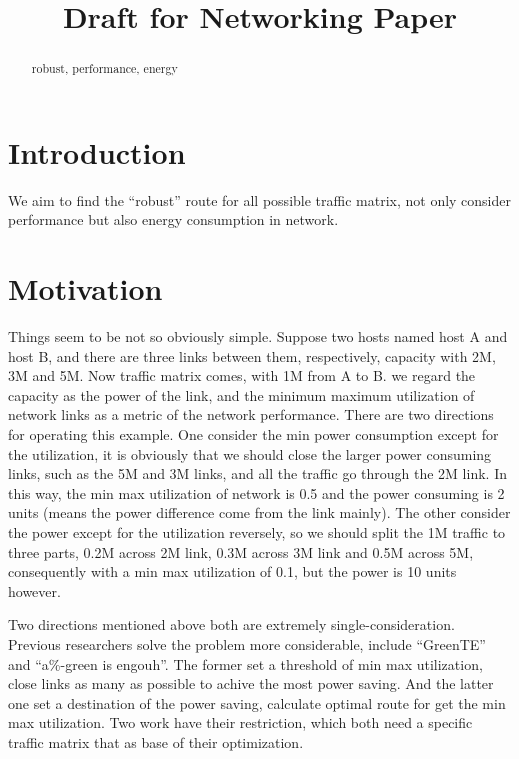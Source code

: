 \documentclass[conference]{IEEEtran}
\begin{document}
\title{Draft for Networking Paper}


\author{
\and
{}
\and
{}
}


\maketitle

\begin{abstract}
robust, performance, energy
\end{abstract}

\IEEEpeerreviewmaketitle

\section{Introduction}
We aim to find the ``robust'' route for all possible traffic matrix, not only consider performance but also energy 
consumption in network.

\section{Motivation}
Things seem to be not so obviously simple. Suppose two hosts named host A and host B, and there are three links between 
them, respectively, capacity with 2M, 3M and 5M. Now traffic matrix comes, with 1M from A to B. we regard the capacity 
as the power of the link, and the minimum maximum utilization of network links as a metric of the network performance. 
There are two directions for operating this example. One consider the min power consumption except for the 
utilization, it is obviously that we should close the larger power consuming links, such as the 5M and 3M links, and 
all the traffic go through the 2M link. In this way, the min max utilization of network is 0.5 and the power consuming 
is 2 units (means the power difference come from the link mainly). The other consider the power except for the 
utilization reversely, so we should split the 1M traffic to three parts, 0.2M across 2M link, 0.3M across 3M link and 
0.5M across 5M, consequently with a min max utilization of 0.1, but the power is 10 units however.

Two directions mentioned above both are extremely single-consideration. Previous researchers solve the problem more 
considerable, include ``GreenTE'' and ``a\%-green is engouh''. The former set a threshold of min max utilization, 
close links as many as possible to achive the most power saving. And the latter one set a destination of the power 
saving, calculate optimal route for get the min max utilization. Two work have their restriction, which both need a 
specific traffic matrix that as base of their optimization.
\end{document}
